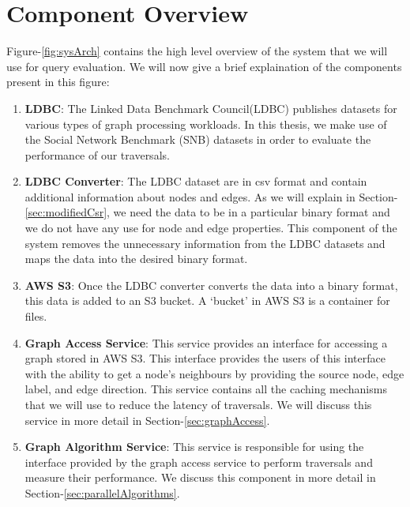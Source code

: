 \section{Component Overview}\label{sec:componentOverview}
Figure-\ref{fig:sysArch} contains the high level overview of the system that
we will use for query evaluation. We will now give a brief explaination of the
components present in this figure:
\begin{enumerate}
    \item \textbf{LDBC}: The Linked Data Benchmark Council(LDBC) publishes datasets
        for various types of graph processing workloads. In this thesis, we make
        use of the Social Network Benchmark (SNB) datasets in order to evaluate
        the performance of our traversals.
    \item \textbf{LDBC Converter}: The LDBC dataset are in csv format and
        contain additional information about nodes and edges. As we will explain
        in Section-\ref{sec:modifiedCsr}, we need the data to be in a particular
        binary format and we do not have any use for node and edge properties.
        This component of the system removes the unnecessary information from
        the LDBC datasets and maps the data into the desired binary format.
    \item \textbf{AWS S3}: Once the LDBC converter converts the data into a
        binary format, this data is added to an S3 bucket. A `bucket' in AWS S3
        is a container for files.
    \item \textbf{Graph Access Service}: This service provides an interface for
        accessing a graph stored in AWS S3. This interface provides the users of
        this interface with the ability to get a node's neighbours by providing
        the source node, edge label, and edge direction. This service contains
        all the caching mechanisms that we will use to reduce the latency of
        traversals. We will discuss this service in more detail in
        Section-\ref{sec:graphAccess}.
    \item \textbf{Graph Algorithm Service}: This service is responsible for
        using the interface provided by the graph access service to perform
        traversals and measure their performance. We discuss this component in
        more detail in Section-\ref{sec:parallelAlgorithms}.
\end{enumerate}
